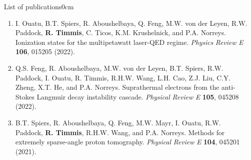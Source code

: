 \begin{mclistof}{List of publications}{0cm}
\begin{enumerate}
		\item I. Ouatu, B.T. Spiers, R. Aboushelbaya, Q. Feng, M.W. von der Leyen, R.W. Paddock, \textbf{R. Timmis}, C. Ticos, K.M. Krushelnick, and P.A. Norreys. Ionization states for the multipetawatt laser-QED regime. \textit{Physics Review E} \textbf{106}, 015205 (2022).
		\item Q.S. Feng, R. Aboushelbaya, M.W. von der Leyen, B.T. Spiers, R.W. Paddock, I. Ouatu, R. Timmis, R.H.W. Wang, L.H. Cao, Z.J. Liu, C.Y. Zheng, X.T. He, and P.A. Norreys. Suprathermal electrons from the anti-Stokes Langmuir decay instability cascade. \textit{Physical Review E} \textbf{105}, 045208 (2022).
		\item B.T. Spiers, R. Aboushelbaya, Q. Feng, M.W. Mayr, I. Ouatu, R.W. Paddock, \textbf{R. Timmis}, R.H.W. Wang, and P.A. Norreys. Methods for extremely sparse-angle proton tomography. \textit{Physical Review E} \textbf{104}, 045201 (2021).
	\end{enumerate}
	
\end{mclistof} 
